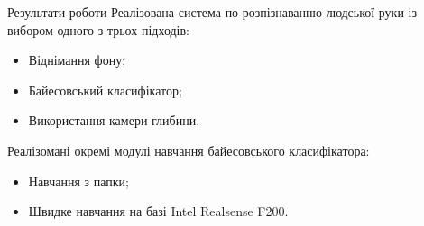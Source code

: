 \begin{frame}{Результати роботи}
	\manimate
	Реалізована система по розпізнаванню людської руки із вибором одного з трьох підходів:
	\begin{itemize}
		\item Віднімання фону;
		\item Байесовський класифікатор;
		\item Використання камери глибини.
	\end{itemize}
	Реалізомані окремі модулі навчання байесовського класифікатора:
	\begin{itemize}
		\item Навчання з папки;
		\item Швидке навчання на базі Intel Realsense F200.
	\end{itemize}
\end{frame}